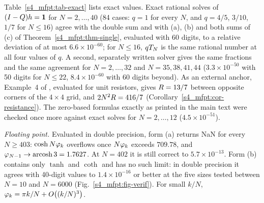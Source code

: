 Table~\ref{s4_mfpt:tab-exact} lists exact values. Exact rational solves of $(I-Q)h=\mathbf{1}$ for $N=2,\dots,40$ (84
cases: $q=1$ for every $N$, and $q=4/5$, $3/10$, $1/7$ for $N\le16$) agree with the double sum and with (a), (b) and
both sums of (c) of Theorem~\ref{s4_mfpt:thm-single}, evaluated with 60 digits, to a relative deviation of at most
$6.6\times10^{-60}$; for $N\le16$, $qT_{N}$ is the same rational number at all four values of $q$.
A second, separately written solver gives the same fractions and the same agreement for $N=2,\dots,32$ and
$N=35,38,41,44$ ($3.3\times10^{-50}$ with 50 digits for $N\le22$, $8.4\times10^{-60}$ with 60 digits beyond).
As an external anchor, Example~4 of \citet{Wu2004}, evaluated for unit resistors, gives $R=13/7$ between
opposite corners of the $4\times4$ grid, and $2N^{2}R=416/7$ (Corollary~\ref{s4_mfpt:cor-resistance}).
The zero-based formulas exactly as printed in the main text were checked once more against exact solves for
$N=2,\dots,12$ ($4.5\times10^{-51}$).

\emph{Floating point.} Evaluated in double precision, form (a) returns NaN for every $N\ge403$: $\cosh N\varphi_{k}$
overflows once $N\varphi_{k}$ exceeds $709.78$, and $\varphi_{N-1}\to\operatorname{arcosh}3=1.7627$. At $N=402$ it is still correct to
$5.7\times10^{-13}$.
Form (b) contains only $\tanh$ and $\coth$ and has no such limit: in double precision it agrees with 40-digit values
to $1.4\times10^{-16}$ or better at the five sizes tested between $N=10$ and $N=6000$ (Fig.~\ref{s4_mfpt:fig-verif}).
For small $k/N$, $\varphi_{k}=\pi k/N+O\bigl((k/N)^{3}\bigr)$.

